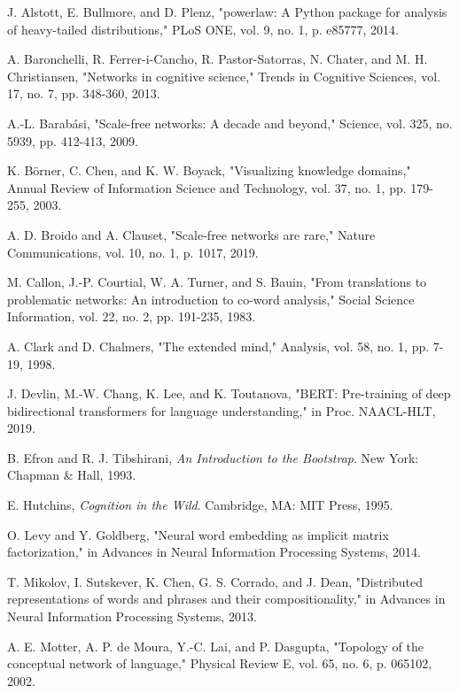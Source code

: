 \documentclass[10pt, a4paper]{article}
\begin{document}

\begin{thebibliography}{00}

 J. Alstott, E. Bullmore, and D. Plenz, "powerlaw: A Python package for analysis of heavy-tailed distributions," PLoS ONE, vol. 9, no. 1, p. e85777, 2014.

 A. Baronchelli, R. Ferrer-i-Cancho, R. Pastor-Satorras, N. Chater, and M. H. Christiansen, "Networks in cognitive science," Trends in Cognitive Sciences, vol. 17, no. 7, pp. 348-360, 2013.

 A.-L. Barabási, "Scale-free networks: A decade and beyond," Science, vol. 325, no. 5939, pp. 412-413, 2009.

 K. Börner, C. Chen, and K. W. Boyack, "Visualizing knowledge domains," Annual Review of Information Science and Technology, vol. 37, no. 1, pp. 179-255, 2003.

 A. D. Broido and A. Clauset, "Scale-free networks are rare," Nature Communications, vol. 10, no. 1, p. 1017, 2019.

 M. Callon, J.-P. Courtial, W. A. Turner, and S. Bauin, "From translations to problematic networks: An introduction to co-word analysis," Social Science Information, vol. 22, no. 2, pp. 191-235, 1983.

 A. Clark and D. Chalmers, "The extended mind," Analysis, vol. 58, no. 1, pp. 7-19, 1998.

 J. Devlin, M.-W. Chang, K. Lee, and K. Toutanova, "BERT: Pre-training of deep bidirectional transformers for language understanding," in Proc. NAACL-HLT, 2019.

 B. Efron and R. J. Tibshirani, \emph{An Introduction to the Bootstrap}. New York: Chapman \& Hall, 1993.

 E. Hutchins, \emph{Cognition in the Wild}. Cambridge, MA: MIT Press, 1995.

 O. Levy and Y. Goldberg, "Neural word embedding as implicit matrix factorization," in Advances in Neural Information Processing Systems, 2014.

 T. Mikolov, I. Sutskever, K. Chen, G. S. Corrado, and J. Dean, "Distributed representations of words and phrases and their compositionality," in Advances in Neural Information Processing Systems, 2013.

 A. E. Motter, A. P. de Moura, Y.-C. Lai, and P. Dasgupta, "Topology of the conceptual network of language," Physical Review E, vol. 65, no. 6, p. 065102, 2002.


\end{thebibliography}
\end{document}

